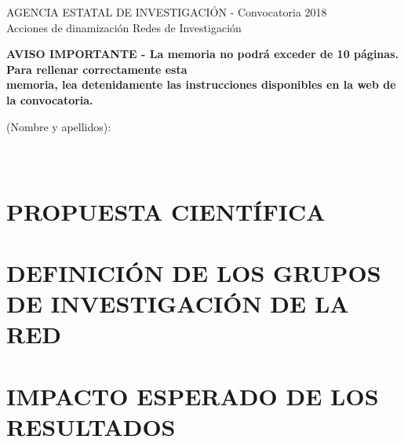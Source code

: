 \documentclass[a4paper,11pt,oneside]{article}
\begin{document}


\begin{tcolorbox}[colback=white,arc=0pt,outer arc=0pt,colframe=black,boxrule=0.6pt]
  \begin{center}
    AGENCIA ESTATAL DE INVESTIGACI\'ON - Convocatoria 2018\\
    Acciones de dinamizaci\'on \guillemotleft Redes de Investigaci\'on\guillemotright
  \end{center}
\end{tcolorbox}
\begin{tcolorbox}[colback=yellow,arc=0pt,outer arc=0pt,colframe=black,boxrule=0.6pt,left=0mm,right=0mm]
  \begin{center}
    \small{\bf AVISO IMPORTANTE - La memoria no podr\'a exceder de 10
      p\'aginas. Para rellenar correctamente esta\\
      memoria, lea detenidamente las instrucciones disponibles en la
      web de la convocatoria.}
  \end{center}
\end{tcolorbox}
 (Nombre y apellidos):\\
\\
\\

\section{PROPUESTA CIENT\'IFICA}

\section{DEFINICI\'ON DE LOS GRUPOS DE INVESTIGACI\'ON DE LA RED}

\section{IMPACTO ESPERADO DE LOS RESULTADOS}
\end{document}

